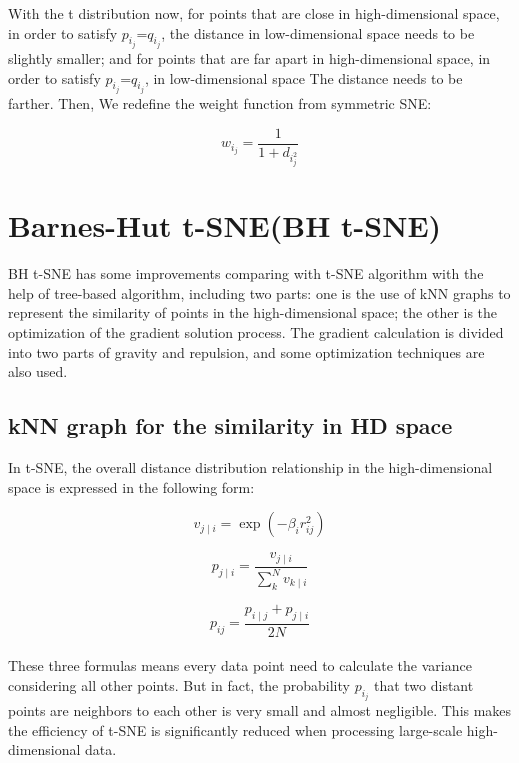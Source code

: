 \noindent With the t distribution now, for points that are close in high-dimensional space, in order to satisfy $p_i_j$=$q_i_j$, the distance in low-dimensional space needs to be slightly smaller; and for points that are far apart in high-dimensional space, in order to satisfy $p_i_j$=$q_i_j$, in low-dimensional space The distance needs to be farther. Then, We redefine the weight function from symmetric SNE: 

\begin{equation*}
    {w_i_j} =  \frac {1}{1+d_i_j^2} 
\end{equation*}

\section{Barnes-Hut t-SNE(BH t-SNE)}

BH t-SNE has some improvements comparing with t-SNE algorithm with the help of tree-based algorithm, including two parts: one is the use of kNN graphs to represent the similarity of points in the high-dimensional space; the other is the optimization of the gradient solution process. The gradient calculation is divided into two parts of gravity and repulsion, and some optimization techniques are also used.

\subsection{kNN graph for the similarity in HD space}

\noindent In t-SNE, the overall distance distribution relationship in the high-dimensional space is expressed in the following form:

\begin{equation*}
    {v_{j\mid i}} = \exp {(-\beta_i r^2_{ij})} 
\end{equation*}

\begin{equation*}
    {p_{j\mid i}} = \frac {v_{j\mid i}} {\sum_k^N v_{k\mid i}}
\end{equation*}

\begin{equation*}
    {p_{i j}} = \frac {p_{i\mid j} + p_{j\mid i}} {2N}
\end{equation*}\\

\noindent These three formulas means every data point need to calculate the variance considering all other points. But in fact, the probability $p_i_j$ that two distant points are neighbors to each other is very small and almost negligible. This makes the efficiency of t-SNE is significantly reduced when processing large-scale high-dimensional data.\\

